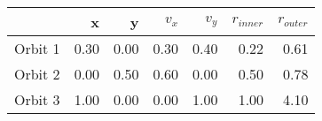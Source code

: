 \begin{tabular}{lrrrrrr}
\toprule
{} &    x &    y &  $v_x$ &  $v_y$ &  $r_{inner}$ &  $r_{outer}$ \\
\midrule
Orbit 1 & 0.30 & 0.00 &   0.30 &   0.40 &         0.22 &         0.61 \\
Orbit 2 & 0.00 & 0.50 &   0.60 &   0.00 &         0.50 &         0.78 \\
Orbit 3 & 1.00 & 0.00 &   0.00 &   1.00 &         1.00 &         4.10 \\
\bottomrule
\end{tabular}
